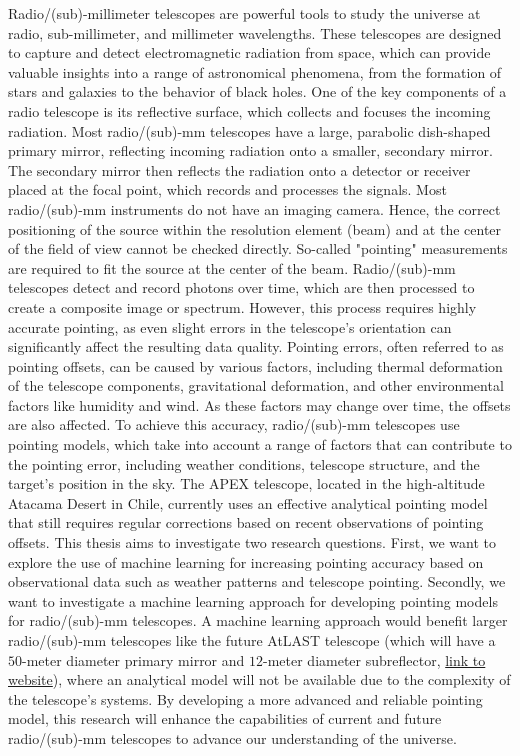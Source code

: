 Radio/(sub)-millimeter telescopes are powerful tools to study the universe at radio, sub-millimeter, and millimeter wavelengths.
These telescopes are designed to capture and detect electromagnetic radiation from space, which can provide valuable insights into a range of astronomical phenomena,
from the formation of stars and galaxies to the behavior of black holes.
One of the key components of a radio telescope is its reflective surface, which collects and focuses the incoming radiation.
Most radio/(sub)-mm telescopes have a large, parabolic dish-shaped primary mirror, reflecting incoming radiation onto a smaller, secondary mirror.
The secondary mirror then reflects the radiation onto a detector or receiver placed at the focal point, which records and processes the signals.
Most radio/(sub)-mm instruments do not have an imaging camera.
Hence, the correct positioning of the source within the resolution element (beam) and at the center of the field of view cannot be checked directly.
So-called "pointing" measurements are required to fit the source at the center of the beam.
Radio/(sub)-mm telescopes detect and record photons over time, which are then processed to create a composite image or spectrum.
However, this process requires highly accurate pointing, as even slight errors in the telescope's orientation can significantly affect the resulting data quality.
Pointing errors, often referred to as pointing offsets, can be caused by various factors, including thermal deformation of the telescope components,
gravitational deformation, and other environmental factors like humidity and wind. As these factors may change over time, the offsets are also affected.
To achieve this accuracy, radio/(sub)-mm telescopes use pointing models, which take into account a range of factors that can contribute to the pointing error,
including weather conditions, telescope structure, and the target's position in the sky.
The APEX telescope, located in the high-altitude Atacama Desert in Chile,
currently uses an effective analytical pointing model that still requires regular corrections based on recent observations of pointing offsets.
This thesis aims to investigate two research questions.
First, we want to explore the use of machine learning for increasing pointing accuracy based on observational data such as weather patterns and telescope pointing.
Secondly, we want to investigate a machine learning approach for developing pointing models for radio/(sub)-mm telescopes.
A machine learning approach would benefit larger radio/(sub)-mm telescopes like the future AtLAST telescope
(which will have a $50$-meter diameter primary mirror and $12$-meter diameter subreflector, \hyperlink{https://www.atlast.uio.no}{link to website}),
where an analytical model will not be available due to the complexity of the telescope's systems.
By developing a more advanced and reliable pointing model,
this research will enhance the capabilities of current and future radio/(sub)-mm telescopes to advance our understanding of the universe.

